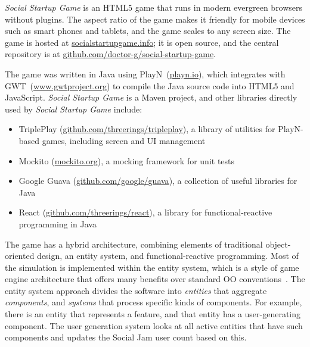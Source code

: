 \documentclass[letterpaper]{article}
\begin{document}
\textit{Social Startup Game} is an HTML5 game that runs
in modern evergreen browsers without plugins. The aspect
ratio of the game makes it friendly for mobile devices such as smart
phones and tablets, and the game scales to any screen size.  The game
is hosted at \url{socialstartupgame.info}; it is open source, and the
central repository is at
\url{github.com/doctor-g/social-startup-game}.

The game was written in Java using PlayN~(\url{playn.io}),
which integrates with GWT~(\url{www.gwtproject.org})
to compile the Java source code into
HTML5 and JavaScript. 
\textit{Social Startup Game} is a Maven project, and other
libraries directly 
used by \textit{Social Startup Game} include: 
\begin{itemize}
\item TriplePlay (\url{github.com/threerings/tripleplay}), 
 a library of utilities for PlayN-based games, including 
 screen and UI management
\item Mockito (\url{mockito.org}), a mocking framework for unit tests
\item Google Guava (\url{github.com/google/guava}), a collection
 of useful libraries for Java
\item React (\url{github.com/threerings/react}), a library for
 functional-reactive programming in Java
\end{itemize}

The game has a hybrid architecture, combining elements of traditional
object-oriented design, an entity system, and functional-reactive
programming.
Most of the simulation is implemented within the entity system,
which is a style of game engine architecture that offers many benefits over
standard OO conventions~\citep{Gestwicki2012,Nystrom2014}. The entity system
approach divides the software into \textit{entities} that
aggregate \textit{components}, and \textit{systems} that process 
specific kinds of components.
For example, there is an entity that represents a feature, and that
entity has a user-generating component. The user generation system
looks at all active entities that have such components and updates
the Social Jam user count based on this.
\end{document}
